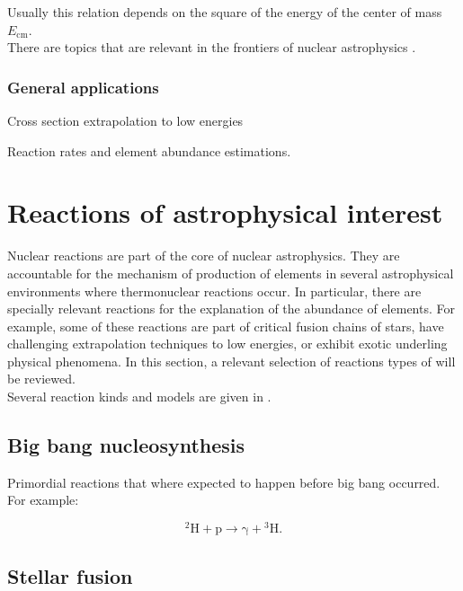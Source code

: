 \documentclass[openany]{book}
\begin{document}
Usually this relation depends on the square of the energy of the center of mass $E_{\mathrm{cm}}$. \\

There are topics that are relevant in the frontiers of nuclear astrophysics  \cite{bertulani_kajino_2016}. 

\subsection{General applications}

Cross section extrapolation to low energies

Reaction rates and element abundance estimations. 

\chapter{Reactions of astrophysical interest}  \label{ch:reactionsInterest}

Nuclear reactions are part of the core of nuclear astrophysics. They are accountable for the mechanism of production of elements in several astrophysical environments where thermonuclear reactions occur. In particular, there are specially relevant reactions for the explanation of the abundance of elements. For example, some of these reactions are part of critical fusion chains of stars, have challenging extrapolation techniques to low energies, or  exhibit exotic underling physical phenomena.   In this section, a relevant selection of reactions types of will be reviewed. \\

Several reaction kinds and models are given in \cite{descouvemont_2020}.

\section{Big bang nucleosynthesis} \label{sec:BBN}

Primordial reactions that where expected to happen before big bang occurred. For example:

\begin{equation}
	\mathrm{{}^{2}H + p \rightarrow \gamma + {}^{3}H}.
\end{equation}

\section{Stellar fusion}  \label{sec:StellarFusion}
\end{document}
